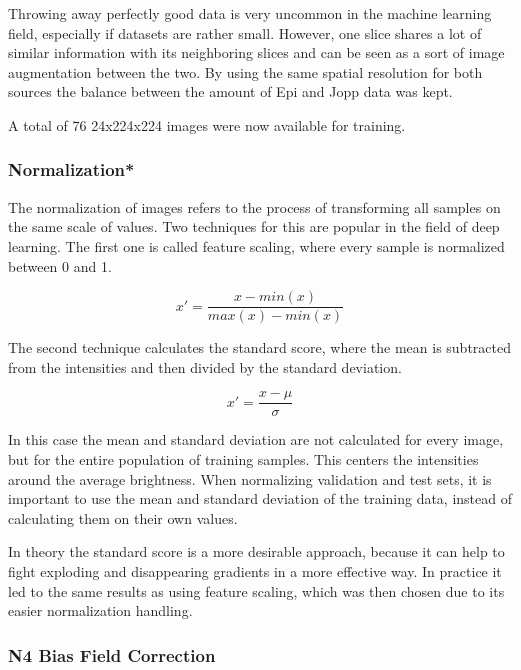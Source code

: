Throwing away perfectly good data is very uncommon in the machine learning field, especially if datasets are rather small. However, one slice shares a lot of similar information with its neighboring slices and can be seen as a sort of image augmentation between the two. By using the same spatial resolution for both sources the balance between the amount of Epi and Jopp data was kept.

A total of 76 24x224x224 images were now available for training.

\subsubsection{Normalization*}

The normalization of images refers to the process of transforming all samples on the same scale of values. Two techniques for this are popular in the field of deep learning. The first one is called feature scaling, where every sample is normalized between 0 and 1.

\begin{equation}
x' = \frac {x - min(x)}{max(x) - min(x)}
\end{equation}

The second technique calculates the standard score, where the mean is subtracted from the intensities and then divided by the standard deviation. 

\begin{equation}
x' = \frac {x - \mu}{\sigma}
\end{equation}

In this case the mean and standard deviation are not calculated for every image, but for the entire population of training samples. This centers the intensities around the average brightness. When normalizing validation and test sets, it is important to use the mean and standard deviation of the training data, instead of calculating them on their own values.

In theory the standard score is a more desirable approach, because it can help to fight exploding and disappearing gradients in a more effective way. In practice it led to the same results as using feature scaling, which was then chosen due to its easier normalization handling.

\subsubsection{N4 Bias Field Correction}

